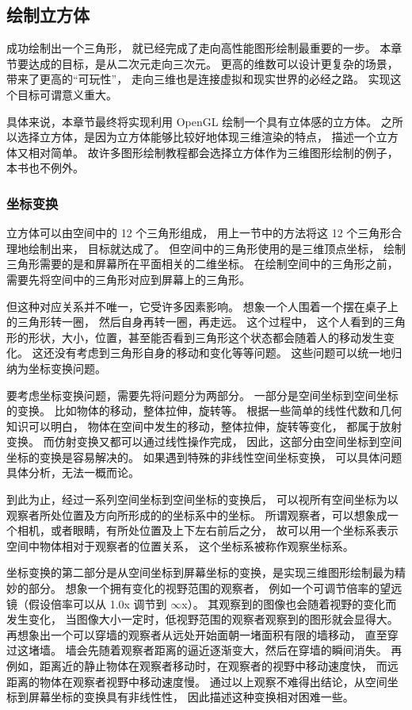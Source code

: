 \documentclass[fontset=windows]{ctexart}
\begin{document}
\subsection{绘制立方体}

\label{sec-gl:rendering-cube}

成功绘制出一个三角形，
就已经完成了走向高性能图形绘制最重要的一步。
本章节要达成的目标，是从二次元走向三次元。
更高的维数可以设计更复杂的场景，
带来了更高的“可玩性”，
走向三维也是连接虚拟和现实世界的必经之路。
实现这个目标可谓意义重大。

具体来说，本章节最终将实现利用 OpenGL 绘制一个具有立体感的立方体。
之所以选择立方体，是因为立方体能够比较好地体现三维渲染的特点，
描述一个立方体又相对简单。
故许多图形绘制教程都会选择立方体作为三维图形绘制的例子，
本书也不例外。

\subsubsection{坐标变换}

\label{sec-gl:coordinate-transform}

立方体可以由空间中的 12 个三角形组成，
用上一节中的方法将这 12 个三角形合理地绘制出来，
目标就达成了。
但空间中的三角形使用的是三维顶点坐标，
绘制三角形需要的是和屏幕所在平面相关的二维坐标。
在绘制空间中的三角形之前，
需要先将空间中的三角形对应到屏幕上的三角形。

但这种对应关系并不唯一，它受许多因素影响。
想象一个人围着一个摆在桌子上的三角形转一圈，
然后自身再转一圈，再走远。
这个过程中，
这个人看到的三角形的形状，大小，位置，甚至能否看到三角形这个状态都会随着人的移动发生变化。
这还没有考虑到三角形自身的移动和变化等等问题。
这些问题可以统一地归纳为坐标变换问题。

要考虑坐标变换问题，需要先将问题分为两部分。
一部分是空间坐标到空间坐标的变换。
比如物体的移动，整体拉伸，旋转等。
根据一些简单的线性代数和几何知识可以明白，
物体在空间中发生的移动，整体拉伸，旋转等变化，
都属于放射变换。
而仿射变换又都可以通过线性操作完成，
因此，这部分由空间坐标到空间坐标的变换是容易解决的。
如果遇到特殊的非线性空间坐标变换，
可以具体问题具体分析，无法一概而论。

到此为止，经过一系列空间坐标到空间坐标的变换后，
可以视所有空间坐标为以观察者所处位置及方向所形成的的坐标系中的坐标。
所谓观察者，可以想象成一个相机，或者眼睛，有所处位置及上下左右前后之分，
故可以用一个坐标系表示空间中物体相对于观察者的位置关系，
这个坐标系被称作观察坐标系。

坐标变换的第二部分是从空间坐标到屏幕坐标的变换，是实现三维图形绘制最为精妙的部分。
想象一个拥有变化的视野范围的观察者，
例如一个可调节倍率的望远镜（假设倍率可以从 1.0x 调节到 $\infty$x）。
其观察到的图像也会随着视野的变化而发生变化，
当图像大小一定时，低视野范围的观察者观察到的图形就会显得大。
再想象出一个可以穿墙的观察者从远处开始面朝一堵面积有限的墙移动，
直至穿过这堵墙。
墙会先随着观察者距离的逼近逐渐变大，然后在穿墙的瞬间消失。
再例如，距离近的静止物体在观察者移动时，在观察者的视野中移动速度快，
而远距离的物体在观察者视野中移动速度慢。
通过以上观察不难得出结论，从空间坐标到屏幕坐标的变换具有非线性性，
因此描述这种变换相对困难一些。
\end{document}

